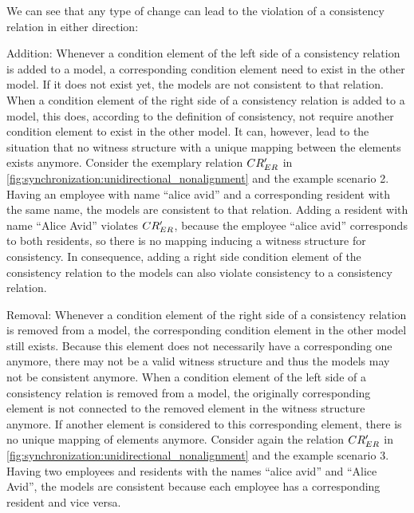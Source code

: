 We can see that any type of change can lead to the violation of a consistency relation in either direction:
\begin{properdescription}
    \item[Addition:] Whenever a condition element of the left side of a consistency relation is added to a model, a corresponding condition element need to exist in the other model. If it does not exist yet, the models are not consistent to that relation.
    When a condition element of the right side of a consistency relation is added to a model, this does, according to the definition of consistency, not require another condition element to exist in the other model. It can, however, lead to the situation that no witness structure with a unique mapping between the elements exists anymore.
    Consider the exemplary relation $CR_{ER}'$ in \autoref{fig:synchronization:unidirectional_nonalignment} and the example scenario 2.
    Having an employee with name \enquote{alice avid} and a corresponding resident with the same name, the models are consistent to that relation.
    Adding a resident with name \enquote{Alice Avid} violates $CR_{ER}'$, because the employee \enquote{alice avid} corresponds to both residents, so there is no mapping inducing a witness structure for consistency.
    In consequence, adding a right side condition element of the consistency relation to the models can also violate consistency to a consistency relation.
    \item[Removal:] Whenever a condition element of the right side of a consistency relation is removed from a model, the corresponding condition element in the other model still exists. Because this element does not necessarily have a corresponding one anymore, there may not be a valid witness structure and thus the models may not be consistent anymore.
    When a condition element of the left side of a consistency relation is removed from a model, the originally corresponding element is not connected to the removed element in the witness structure anymore. If another element is considered to this corresponding element, there is no unique mapping of elements anymore.
    Consider again the relation $CR_{ER}'$ in \autoref{fig:synchronization:unidirectional_nonalignment} and the example scenario 3.
    Having two employees and residents with the names \enquote{alice avid} and \enquote{Alice Avid}, the models are consistent because each employee has a corresponding resident and vice versa.

\end{properdescription}
